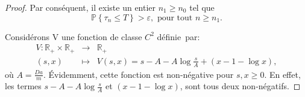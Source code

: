 \documentclass[12pt,a4paper]{report}%
\begin{document}
\begin{proof}
	Par conséquent, il existe un entier \(n_1 \geq n_0\) tel que
	\begin{equation}\label{p1}
		\mathbb{P}\left\{\tau_n \leq T\right\}>\varepsilon, \text{ pour tout } n \geq n_1.
	\end{equation}
	
Considérons V une fonction de classe \(C^2\) définie par: 
	$$
	\begin{array}{rcl}
		V:\mathbb{R}_{+} \times \mathbb{R}_{+} &\to& \mathbb{R}_+\\
		(s, x) &\mapsto &V(s, x)=s - A - A \log \frac{s}{A} + (x - 1 - \log x),
	\end{array}
	$$
	où {\bf \(A = \frac{Da}{m}\)}. Évidemment, cette fonction est non-négative pour \(s, x \geq 0\). En effet, les termes \(s - A - A \log \frac{s}{A}\) et \((x - 1 - \log x)\), sont tous deux non-négatifs.
	

\end{proof}
\end{document}
